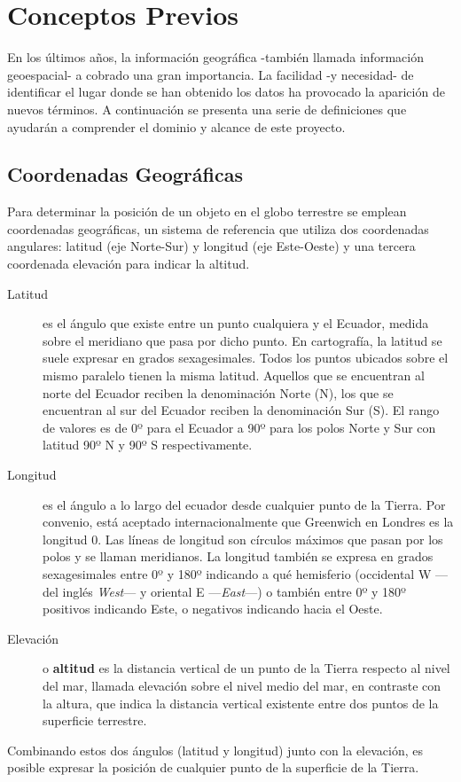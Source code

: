 \chapter[Conceptos Previos]{
  \label{chp:conceptos}
  Conceptos Previos
}
\minitoc
\newpage

En los últimos años, la información geográfica -también llamada información
geoespacial- a cobrado una gran importancia. La facilidad -y necesidad- de
identificar el lugar donde se han obtenido los datos ha provocado la
aparición de nuevos términos. A continuación se presenta una serie de
definiciones que ayudarán a comprender el dominio y alcance de este proyecto.


\section{Coordenadas Geográficas}

Para determinar la posición de un objeto en el globo terrestre se emplean
coordenadas geográficas, un sistema de referencia que utiliza  dos
coordenadas angulares: latitud (eje Norte-Sur) y longitud (eje Este-Oeste)
y una tercera coordenada elevación para indicar la altitud.

\begin{description}
 \item[Latitud] es el ángulo que existe entre un punto cualquiera y el
 Ecuador, medida sobre el meridiano que pasa por dicho punto. En cartografía,
 la latitud se suele expresar en grados sexagesimales. Todos los puntos
 ubicados sobre el mismo paralelo tienen la misma latitud. Aquellos que se
 encuentran al norte del Ecuador reciben la denominación Norte (N), los que se
 encuentran al sur del Ecuador reciben la denominación Sur (S).
 El rango de valores es de 0º para el Ecuador a 90º para los polos Norte y Sur
 con latitud 90º N y 90º S respectivamente.
 \item[Longitud] es el ángulo a lo largo del ecuador desde cualquier punto de
 la Tierra. Por convenio, está aceptado internacionalmente que Greenwich en Londres
 es la longitud 0. Las líneas de longitud son círculos máximos que pasan por los
 polos y se llaman meridianos. La longitud también se expresa en grados
 sexagesimales entre 0º y 180º indicando a qué hemisferio (occidental W —del
 inglés \textit{West}— y oriental E —\textit{East}—) o también entre 0º y 180º positivos
 indicando Este, o negativos indicando hacia el Oeste.
 \item[Elevación] o \textbf{altitud} es la distancia vertical de un punto de la Tierra
 respecto al nivel del mar, llamada elevación sobre el nivel medio del mar, en contraste
 con la altura, que indica la distancia vertical existente entre dos puntos de la
 superficie terrestre.
\end{description}

Combinando estos dos ángulos (latitud y longitud) junto con la elevación, es posible
expresar la posición de cualquier punto de la superficie de la Tierra.
